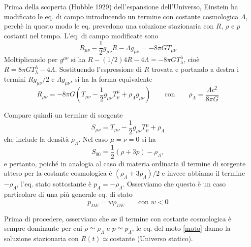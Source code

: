 Prima della scoperta (Hubble 1929) dell'espansione dell'Universo, Einstein ha
modificato le eq. di campo introducendo un termine con costante cosmologica
$\Lambda$, perchè in questo modo le eq. prevedono una soluzione stazionaria con
$R$, $\rho$ e $p$ costanti nel tempo. L'eq. di campo modificate sono
\begin{equation}
  R_{\mu \nu} - \frac{1}{2} g_{\mu \nu} R - \Lambda g_{\mu \nu} =
  - 8 \pi G T_{\mu \nu}
  \label{EECC1}
\end{equation}
Moltiplicando per $g^{\mu \nu}$ si ha $R - (1/2) 4 R - 4\Lambda = -8 \pi G
T^{\lambda}_{\lambda}$, cioè $R=8 \pi G T^{\lambda}_{\lambda} -4 \Lambda$.
Sostituendo l'espressione di $R$ trovata e portando a destra i termini $R g_{\mu
  \nu}/2$ e $\Lambda g_{\mu \nu}$, si ha la forma equivalente
\begin{equation}
  R_{\mu \nu} = - 8 \pi G   \left(
    T_{\mu \nu} - \frac {1}{2} g_{\mu \nu} T^{\mu}_{\mu} + \rho_{\Lambda} g_{\mu \nu}
  \right) \qquad\text{con}\qquad \rho_{\Lambda} = \frac {\Lambda c^2} {8 \pi G}
  \label{EECC2}
\end{equation}

Compare quindi un termine di sorgente
\begin{equation}
  S_{\mu \nu}=T_{\mu \nu} - \frac {1}{2} g_{\mu \nu} T^{\mu}_{\mu} + \rho_{\Lambda}
\end{equation}
che include la densità $\rho_{\Lambda}$.  Nel caso $\mu=\nu=0$ si ha
\begin{equation}
  S_{00} = \frac {1}{2} (\rho+3p) - \rho_{\Lambda},
  \label{945}
\end{equation}
e pertanto, poiché in analogia al caso di materia ordinaria il termine di
sorgente atteso per la costante cosmologica è $(\rho_{\Lambda}+3p_{\Lambda})/2$
e invece abbiamo il termine $-\rho_{\Lambda}$, l'eq. stato sottostante è
$p_{\Lambda} = - \rho_{\Lambda}$.  Osserviamo che questo è un caso particolare
di una più generale eq. di stato
\begin{equation}
  p_{DE}= w \rho_{DE} \qquad\text{con } w<0
\end{equation}

Prima di procedere, osserviano che se il termine con costante cosmologica è
sempre dominante per cui $\rho \simeq \rho_{\Lambda}$ e $p \simeq p_{\Lambda}$,
le eq. del moto \eqref{moto} danno la soluzione stazionaria con $R(t) \simeq
\text{costante}$ (Universo statico).

